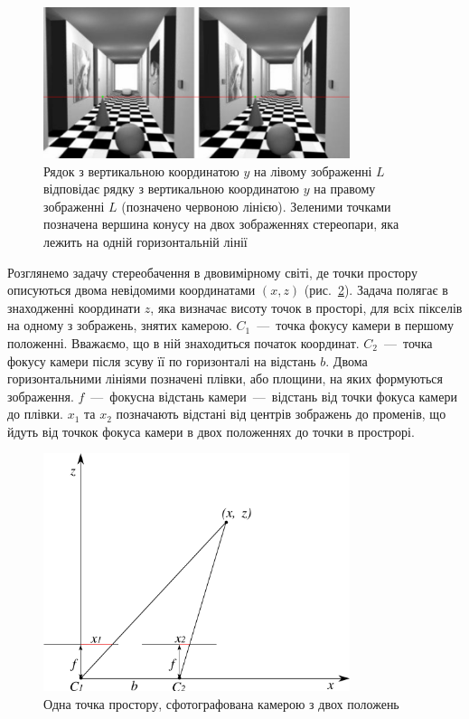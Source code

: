 \begin{figure}[h]
  \centering
  \includegraphics[width=0.8\textwidth]{images/one_line}
  \caption{Рядок з вертикальною координатою $y$
           на лівому зображенні $L$ відповідає
           рядку з вертикальною координатою $y$ на правому зображенні $L$
           (позначено червоною лінією).
           Зеленими точками позначена вершина конусу на двох зображеннях
           стереопари, яка лежить на одній горизонтальній лінії}
  \label{fig:one:line}
\end{figure}

Розглянемо задачу стереобачення в двовимірному світі,
де точки простору описуються двома невідомими координатами
$ \left( x, z \right) $ (рис.~\ref{fig:geometry}).
Задача полягає в знаходженні координати $z$,
яка визначає висоту точок в просторі,
для всіх пікселів на одному з зображень,
знятих камерою.
$C_1$~---~точка фокусу камери в першому положенні.
Вважаємо, що в ній знаходиться початок координат.
$C_2$~---~точка фокусу камери після зсуву її по горизонталі на відстань $b$.
Двома горизонтальними лініями позначені плівки, або площини,
на яких формуються зображення.
$f$~---~фокусна відстань камери~---~відстань від точки фокуса камери до плівки.
$x_1$ та $x_2$ позначають відстані від центрів зображень до променів,
що йдуть від точкок фокуса камери в двох положеннях до точки в прострорі.

\begin{figure}[h]
  \centering
  \includegraphics[width=0.8\textwidth]{images/2d_geometry}
  \caption{Одна точка простору, сфотографована камерою з двох положень}
  \label{fig:geometry}
\end{figure}

